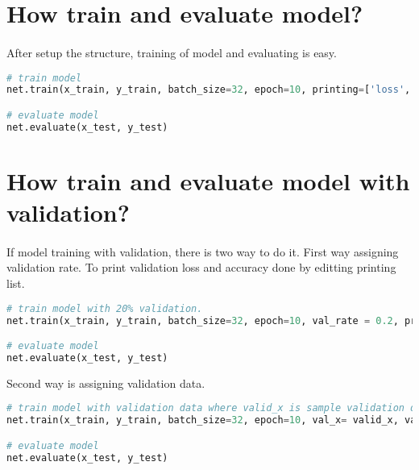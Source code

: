 \documentclass[12pt]{report}
\begin{document}
\section{How train and evaluate model?}
\paragraph{}
After setup the structure, training of model and evaluating is easy. 

\begin{lstlisting}[language=Python, numbers=none, caption={Train and evaluate model.}, label={ex:train}]
# train model
net.train(x_train, y_train, batch_size=32, epoch=10, printing=['loss', 'accuracy'])

# evaluate model
net.evaluate(x_test, y_test)

\end{lstlisting}




\section{How train and evaluate model with validation?}
\paragraph{}
If model training with validation, there is two way to do it. First way assigning validation rate. To print validation loss and accuracy done by editting printing list. 

\begin{lstlisting}[language=Python, numbers=none, caption={Train and evaluate model with validation rate.}, label={ex:train-val-rate}]
# train model with 20% validation.
net.train(x_train, y_train, batch_size=32, epoch=10, val_rate = 0.2, printing=['loss', 'accuracy', 'val_loss', 'val_acc'])

# evaluate model
net.evaluate(x_test, y_test)

\end{lstlisting}

Second way is assigning validation data. 

\begin{lstlisting}[language=Python, numbers=none, caption={Train and evaluate model with validation data.}, label={ex:train-val-data}]
# train model with validation data where valid_x is sample validation data and valid_y is labels of them.
net.train(x_train, y_train, batch_size=32, epoch=10, val_x= valid_x, val_y=valid_y, printing=['loss', 'accuracy', 'val_loss', 'val_acc'])

# evaluate model
net.evaluate(x_test, y_test)

\end{lstlisting}
\end{document}
